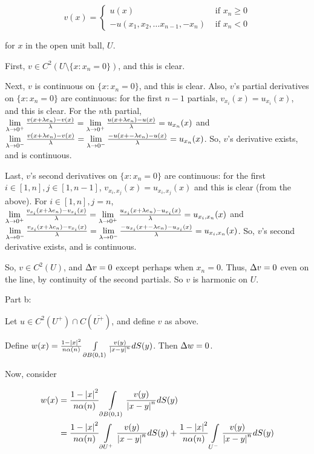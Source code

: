 \documentclass[a4paper,12pt]{article}
\begin{document}
\begin{displaymath}
v(x) =
   \left\{
     \begin{array}{lr}
       u(x) & \text{ if } x_n \geq 0\\
       -u(x_1,x_2, \ldots x_{n-1}, -x_n) & \text{ if } x_n < 0
     \end{array}
   \right.
\end{displaymath}

for $x$ in the open unit ball, $U$.

First, $v \in C^2( U \setminus \{x: x_n = 0\})$, and this is clear.

Next, $v$ is continuous on $\{x: x_n = 0\}$, and this is clear. Also, $v$'s partial derivatives on $\{x: x_n = 0\}$ are continuous: for the first $n-1$ partials, $v_{x_i}(x) = u_{x_i}(x)$, and this is clear. For the $n$th partial, $\lim\limits_{\lambda \to 0^+} \frac{v(x + \lambda e_n) - v(x)}{\lambda} = \lim\limits_{\lambda \to 0^+} \frac{u(x + \lambda e_n) - u(x)}{\lambda} = u_{x_n}(x)$ and $\lim\limits_{\lambda \to 0^-} \frac{v(x + \lambda e_n) - v(x)}{\lambda} = \lim\limits_{\lambda \to 0^-} \frac{-u(x + -\lambda e_n) - u(x)}{\lambda} = u_{x_n}(x)$. So, $v$'s derivative exists, and is continuous.

Last, $v$'s second derivatives on $\{x: x_n = 0\}$ are continuous: for the first $i \in [1,n], j \in [1,n-1]$, $v_{x_i, x_j}(x) = u_{x_i, x_j}(x)$ and this is clear (from the above). For $i \in [1,n], j = n$, $\lim\limits_{\lambda \to 0^+} \frac{v_{x_i}(x + \lambda e_n) - v_{x_i}(x)}{\lambda} = \lim\limits_{\lambda \to 0^+} \frac{u_{x_i}(x + \lambda e_n) - u_{x_i}(x)}{\lambda} = u_{x_i,x_n}(x)$ and $\lim\limits_{\lambda \to 0^-} \frac{v_{x_i}(x + \lambda e_n) - v_{x_i}(x)}{\lambda} = \lim\limits_{\lambda \to 0^-} \frac{-u_{x_i}(x + -\lambda e_n) - u_{x_i}(x)}{\lambda} = u_{x_i,x_n}(x)$. So, $v$'s second derivative exists, and is continuous.

So, $v \in C^2(U)$, and $\Delta v = 0$ except perhaps when $x_n = 0$. Thus, $\Delta v = 0$ even on the line, by continuity of the second partials. So $v$ is harmonic on $U$.

\shunt

Part b:

Let $u \in C^2(U^+) \cap C(\overline{U^+})$, and define $v$ as above.

Define $w(x) = \frac{1-\left\lvert x \right\rvert^2}{n \alpha(n)} \int\limits_{\partial B(0,1)} \frac{v(y)}{\left\lvert x-y \right\rvert^n} dS(y)$. Then $\Delta w = 0$.

Now, consider

\begin{align*}
w(x) &= \frac{1-\left\lvert x \right\rvert^2}{n \alpha(n)} \int\limits_{\partial B(0,1)} \frac{v(y)}{\left\lvert x-y \right\rvert^n} dS(y)\\
&= \frac{1-\left\lvert x \right\rvert^2}{n \alpha(n)} \int\limits_{\partial U^+} \frac{v(y)}{\left\lvert x-y \right\rvert^n} dS(y) + \frac{1-\left\lvert x \right\rvert^2}{n \alpha(n)} \int\limits_{U^-} \frac{v(y)}{\left\lvert x-y \right\rvert^n} dS(y)\\
\end{align*}
\end{document}

